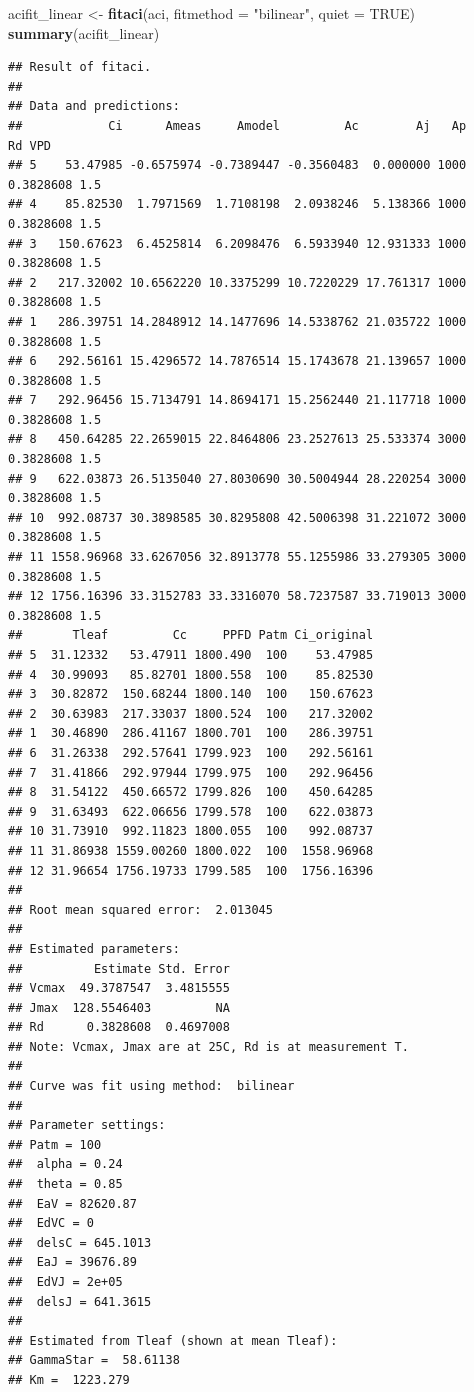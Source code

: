 \documentclass[
]{krantz}
\makeatletter
\newenvironment{Shaded}{\begin{snugshade}}{\end{snugshade}}
\newcommand{\DataTypeTok}[1]{\textcolor[rgb]{0.13,0.29,0.53}{#1}}
\newcommand{\KeywordTok}[1]{\textcolor[rgb]{0.13,0.29,0.53}{\textbf{#1}}}
\newcommand{\NormalTok}[1]{#1}
\newcommand{\OtherTok}[1]{\textcolor[rgb]{0.56,0.35,0.01}{#1}}
\newcommand{\StringTok}[1]{\textcolor[rgb]{0.31,0.60,0.02}{#1}}
\newenvironment{kframe}{%
\medskip{}
\setlength{\fboxsep}{.8em}
 \def\at@end@of@kframe{}%
 \ifinner\ifhmode%
  \def\at@end@of@kframe{\end{minipage}}%
  \begin{minipage}{\columnwidth}%
 \fi\fi%
 \def\FrameCommand##1{\hskip\@totalleftmargin \hskip-\fboxsep
 \colorbox{shadecolor}{##1}\hskip-\fboxsep
     \hskip-\linewidth \hskip-\@totalleftmargin \hskip\columnwidth}%
 \MakeFramed {\advance\hsize-\width
   \@totalleftmargin\z@ \linewidth\hsize
   \@setminipage}}%
 {\par\unskip\endMakeFramed%
 \at@end@of@kframe}
\renewenvironment{Shaded}{\begin{kframe}}{\end{kframe}}
\makeatother
\begin{document}
\begin{Shaded}
\begin{Highlighting}[]
\NormalTok{acifit_linear <-}\StringTok{ }\KeywordTok{fitaci}\NormalTok{(aci,  }\DataTypeTok{fitmethod =} \StringTok{"bilinear"}\NormalTok{, }\DataTypeTok{quiet =} \OtherTok{TRUE}\NormalTok{)}
\KeywordTok{summary}\NormalTok{(acifit_linear)}
\end{Highlighting}
\end{Shaded}

\begin{verbatim}
## Result of fitaci.
## 
## Data and predictions:
##            Ci      Ameas     Amodel         Ac        Aj   Ap        Rd VPD
## 5    53.47985 -0.6575974 -0.7389447 -0.3560483  0.000000 1000 0.3828608 1.5
## 4    85.82530  1.7971569  1.7108198  2.0938246  5.138366 1000 0.3828608 1.5
## 3   150.67623  6.4525814  6.2098476  6.5933940 12.931333 1000 0.3828608 1.5
## 2   217.32002 10.6562220 10.3375299 10.7220229 17.761317 1000 0.3828608 1.5
## 1   286.39751 14.2848912 14.1477696 14.5338762 21.035722 1000 0.3828608 1.5
## 6   292.56161 15.4296572 14.7876514 15.1743678 21.139657 1000 0.3828608 1.5
## 7   292.96456 15.7134791 14.8694171 15.2562440 21.117718 1000 0.3828608 1.5
## 8   450.64285 22.2659015 22.8464806 23.2527613 25.533374 3000 0.3828608 1.5
## 9   622.03873 26.5135040 27.8030690 30.5004944 28.220254 3000 0.3828608 1.5
## 10  992.08737 30.3898585 30.8295808 42.5006398 31.221072 3000 0.3828608 1.5
## 11 1558.96968 33.6267056 32.8913778 55.1255986 33.279305 3000 0.3828608 1.5
## 12 1756.16396 33.3152783 33.3316070 58.7237587 33.719013 3000 0.3828608 1.5
##       Tleaf         Cc     PPFD Patm Ci_original
## 5  31.12332   53.47911 1800.490  100    53.47985
## 4  30.99093   85.82701 1800.558  100    85.82530
## 3  30.82872  150.68244 1800.140  100   150.67623
## 2  30.63983  217.33037 1800.524  100   217.32002
## 1  30.46890  286.41167 1800.701  100   286.39751
## 6  31.26338  292.57641 1799.923  100   292.56161
## 7  31.41866  292.97944 1799.975  100   292.96456
## 8  31.54122  450.66572 1799.826  100   450.64285
## 9  31.63493  622.06656 1799.578  100   622.03873
## 10 31.73910  992.11823 1800.055  100   992.08737
## 11 31.86938 1559.00260 1800.022  100  1558.96968
## 12 31.96654 1756.19733 1799.585  100  1756.16396
## 
## Root mean squared error:  2.013045 
## 
## Estimated parameters:
##          Estimate Std. Error
## Vcmax  49.3787547  3.4815555
## Jmax  128.5546403         NA
## Rd      0.3828608  0.4697008
## Note: Vcmax, Jmax are at 25C, Rd is at measurement T.
## 
## Curve was fit using method:  bilinear 
## 
## Parameter settings:
## Patm = 100
##  alpha = 0.24
##  theta = 0.85
##  EaV = 82620.87
##  EdVC = 0
##  delsC = 645.1013
##  EaJ = 39676.89
##  EdVJ = 2e+05
##  delsJ = 641.3615
## 
## Estimated from Tleaf (shown at mean Tleaf):
## GammaStar =  58.61138 
## Km =  1223.279
\end{verbatim}
\end{document}
